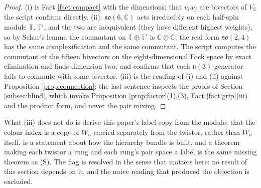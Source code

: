 \documentclass[11pt]{article}
\theoremstyle{definition}
\newcommand{\C}{\mathbb{C}}
\newcommand{\T}{\mathbb{T}}
\newcommand{\uu}{\mathfrak{u}}
\newcommand{\so}{\mathfrak{so}}
\begin{document}
\begin{proof}
(i) is Fact \ref{fact:compact} with the dimensions; that $v_{i}w_{j}$ are bivectors of $V_{\C}$ the script confirms directly. (ii): $\so(6,\C)$ acts irreducibly on each half-spin module $\T$, $\T'$, and the two are inequivalent (they have different highest weights), so by Schur's lemma the commutant on $\T \oplus \T'$ is $\C \oplus \C$; the real form $\so(2,4)$ has the same complexification and the same commutant. The script computes the commutant of the fifteen bivectors on the eight-dimensional Fock space by exact elimination and finds dimension two, and confirms that each $\uu(3)$ generator fails to commute with some bivector. (iii) is the reading of (i) and (ii) against Proposition \ref{prop:connection}; the last sentence inspects the proofs of Section \ref{subsec:blind}, which invoke Proposition \ref{prop:factor}(1),(3), Fact \ref{fact:grip}(iii) and the product form, and never the pair mixing.
\end{proof}

What (iii) does not do is derive this paper's label copy from the module: that the colour index is a copy of $W_{u}$ carried separately from the twistor, rather than $W_{u}$ itself, is a statement about how the hierarchy bundle is built, and a theorem making each twistor a rung and each rung's pair space a label is the same missing theorem as (S). The flag is resolved in the sense that matters here: no result of this section depends on it, and the naive reading that produced the objection is excluded.
\end{document}
